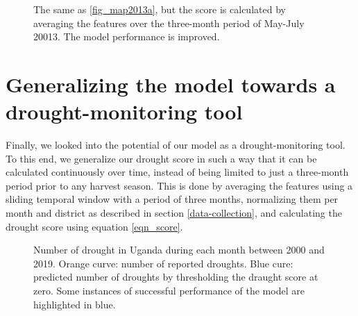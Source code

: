 \documentclass[10pt,parskip=half,
toc=sectionentrywithdots,
bibliography=totocnumbered,
captions=tableheading,numbers=noendperiod]{scrartcl}
\begin{document}
\begin{figure}[H]\begin{center}\end{center}\caption{The same as \ref{fig_map2013a}, but the score is calculated by averaging
the features over the three-month period of May-July 20013. The model
performance is improved.}\label{fig_map2013b}\end{figure}

\hypertarget{generalizing-the-model-towards-a-drought-monitoring-tool}{%
\section{Generalizing the model towards a drought-monitoring
tool}\label{generalizing-the-model-towards-a-drought-monitoring-tool}}

Finally, we looked into the potential of our model as a
drought-monitoring tool. To this end, we generalize our drought score in
such a way that it can be calculated continuously over time, instead of
being limited to just a three-month period prior to any harvest season.
This is done by averaging the features using a sliding temporal window
with a period of three months, normalizing them per month and district
as described in section \ref{data-collection}, and calculating the
drought score using equation \ref{eqn_score}.

\begin{figure}[H]\begin{center}\end{center}\caption{Number of drought in Uganda during each month between 2000 and 2019.
Orange curve: number of reported droughts. Blue cure: predicted number
of droughts by thresholding the draught score at zero. Some instances of
successful performance of the model are highlighted in blue.}\label{fig_droughtcount}\end{figure}
\end{document}
